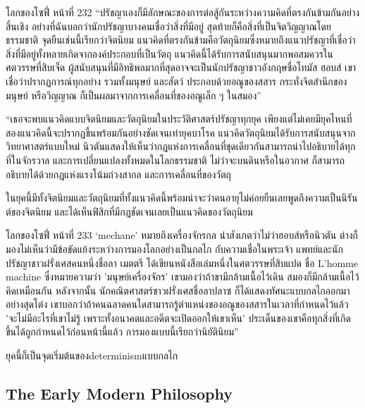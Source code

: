 \begin{bookquote}{โลกของโซฟี่ หน้าที่ 232}
“ปรัชญาเองก็มีลักษณะของการต่อสู้กันระหว่างความคิดที่ตรงกันข้ามกันอย่างสิ้นเชิง อย่างที่ฉันบอกว่านักปรัชญาบางคนเชื่อว่าสิ่งที่มีอยู่ สุดท้ายก็คือสิ่งที่เป็นจิตวิญญาณโดยธรรมชาติ จุดยืนเช่นนี้เรียกว่าจิตนิยม แนวคิดที่ตรงกันข้ามคือวัตถุนิยมซึ่งหมายถึงแนวปรัชญาที่เชื่อว่าสิ่งที่มีอยู่ทั้งหลายเกิดจากองค์ประกอบที่เป็นวัตถุ แนวคิดนี้ได้รับการสนับสนุนมากพอสมควรในศตวรรษที่สิบเจ็ด ผู้สนับสนุนที่มีอิทธิพลมากที่สุดอาจจะเป็นนักปรัชญาชาวอังกฤษชื่อโทมัส ฮอบส์ เขาเชื่อว่าปรากฏการณ์ทุกอย่าง รวมทั้งมนุษย์ และสัตว์ ประกอบด้วยอณูของสสาร กระทั่งจิตสำนึกของมนุษย์ หรือวิญญาณ ก็เป็นผลมาจากการเคลื่อนที่ของอณูเล็ก ๆ ในสมอง”

“เธอจะพบแนวคิดแบบจิตนิยมและวัตถุนิยมในประวัติศาสตร์ปรัชญาทุกยุค เพียงแต่ไม่เคยมียุคไหนที่สองแนวคิดนี้จะปรากฏขึ้นพร้อมกันอย่างชัดเจนเท่ายุคบาโรค แนวคิดวัตถุนิยมได้รับการสนับสนุนจากวิทยาศาสตร์แบบใหม่ นิวตันแสดงให้เห็นว่ากฎแห่งการเคลื่อนที่ชุดเดียวกันสามารถนำไปอธิบายได้ทุกที่ในจักรวาล และการเปลี่ยนแปลงทั้งหมดในโลกธรรมชาติ ไม่ว่าจะบนดินหรือในอวกาศ ก็สามารถอธิบายได้ด้วยกฎแห่งแรงโน้มถ่วงสากล และการเคลื่อนที่ของวัตถุ
\end{bookquote}

ในยุคนี้มีทั้งจิตนิยมและวัตถุนิยมที่ทั้งแนวคิดนี้พร้อมน่าจะว่าคนอายุไม่ค่อยยืนเลยพูดถึงความเป็นนิรันต์ของจิตนิยม และได้เห็นฟิสิกที่มีกฎชัดเจนเลยเป็นแนวคิดของวัตถุนิยม

\begin{bookquote}{โลกของโซฟี่ หน้าที่ 233}
‘mechane’ หมายถึงเครื่องจักรกล น่าสังเกตว่าไม่ว่าฮอบส์หรือนิวตัน ต่างก็มองไม่เห็นว่ามีข้อขัดแย้งระหว่างการมองโลกอย่างเป็นกลไก กับความเชื่อในพระเจ้า แพทย์และนักปรัชญาชาวฝรั่งเศสคนหนึ่งชื่อลา เมตตรี ได้เขียนหนังสือเล่มหนึ่งในศตวรรษที่สิบแปด ชื่อ L’homme machine ซึ่งหมายความว่า 'มนุษย์เครื่องจักร' เขามองว่าถ้าขามีกล้ามเนื้อไว้เดิน สมองก็มีกล้ามเนื้อไว้คิดเหมือนกัน หลังจากนั้น นักคณิตศาสตร์ชาวฝรั่งเศสชื่อลาปลาซ ก็ได้แสดงทัศนะแบบกลไกออกมาอย่างสุดโต่ง เขาบอกว่าถ้าคนฉลาดคนใดสามารถรู้ตำแหน่งของอณูของสสารในเวลาที่กำหนดไว้แล้ว 'จะไม่มีอะไรที่เขาไม่รู้ เพราะทั้งอนาคตและอดีตจะเปิดออกให้เขาเห็น' ประเด็นของเขาคือทุกสิ่งที่เกิดขึ้นได้ถูกกำหนดไว้ก่อนหน้านี้แล้ว การมองแบบนี้เรียกว่านิยัตินิยม”
\end{bookquote}

ยุคนี้ก็เป็นจุดเริ่มต้นของdeterminismแบบกลไก

\subsection{The Early Modern Philosophy}

